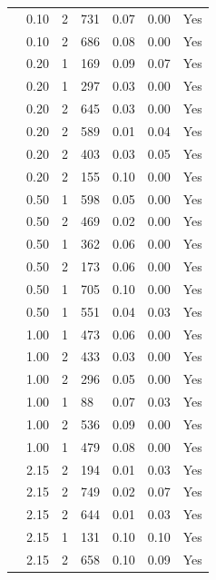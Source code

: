 \begin{longtable}{ | M{2.0cm} | M{2.0cm} | M{1.5cm} | M{1.5cm} | M{2.0cm} | M{2.0cm} | M{1.5cm} | }
                 & 0.10 & 2 & 731 & 0.07 & 0.00 & Yes \\
                 & 0.10 & 2 & 686 & 0.08 & 0.00 & Yes \\
                 & 0.20 & 1 & 169 & 0.09 & 0.07 & Yes \\
                 & 0.20 & 1 & 297 & 0.03 & 0.00 & Yes \\
                 & 0.20 & 2 & 645 & 0.03 & 0.00 & Yes \\
                 & 0.20 & 2 & 589 & 0.01 & 0.04 & Yes \\
                 & 0.20 & 2 & 403 & 0.03 & 0.05 & Yes \\
                 & 0.20 & 2 & 155 & 0.10 & 0.00 & Yes \\
                 & 0.50 & 1 & 598 & 0.05 & 0.00 & Yes \\
                 & 0.50 & 2 & 469 & 0.02 & 0.00 & Yes \\
                 & 0.50 & 1 & 362 & 0.06 & 0.00 & Yes \\
                 & 0.50 & 2 & 173 & 0.06 & 0.00 & Yes \\
                 & 0.50 & 1 & 705 & 0.10 & 0.00 & Yes \\
                 & 0.50 & 1 & 551 & 0.04 & 0.03 & Yes \\
                 & 1.00 & 1 & 473 & 0.06 & 0.00 & Yes \\
                 & 1.00 & 2 & 433 & 0.03 & 0.00 & Yes \\
                 & 1.00 & 2 & 296 & 0.05 & 0.00 & Yes \\
                 & 1.00 & 1 & 88  & 0.07 & 0.03 & Yes \\
                 & 1.00 & 2 & 536 & 0.09 & 0.00 & Yes \\
                 & 1.00 & 1 & 479 & 0.08 & 0.00 & Yes \\
                 & 2.15 & 2 & 194 & 0.01 & 0.03 & Yes \\
                 & 2.15 & 2 & 749 & 0.02 & 0.07 & Yes \\
                 & 2.15 & 2 & 644 & 0.01 & 0.03 & Yes \\
                 & 2.15 & 1 & 131 & 0.10 & 0.10 & Yes \\
                 & 2.15 & 2 & 658 & 0.10 & 0.09 & Yes \\

\end{longtable}
